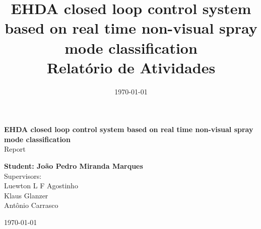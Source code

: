\begin{titlepage}
    \begin{center}
           
    \begin{figure}
            \centering
            \hspace{0.1\textwidth}
            \vspace{3cm} 
        \end{figure}

    

    {\bf\Large EHDA closed loop control system based on real time non-visual spray mode classification\\}
    \vspace{1cm} 
    {\Large Report}
    \vspace{2cm}  
    
    {\bf\large Student: João Pedro Miranda Marques}\\
    \vspace{2cm}
    {\large Supervisors:\\ Luewton L F Agostinho\\
            Klaus Glanzer \\
            Antônio Carrasco}
    \vspace{2cm}  

    \today
    \vspace{2cm}  
       

    \large \date{\today}
    \end{center}
    
    \end{titlepage}



\title{
    EHDA closed loop control system based on real time non-visual spray mode classification \\
    \large Relatório de Atividades}
